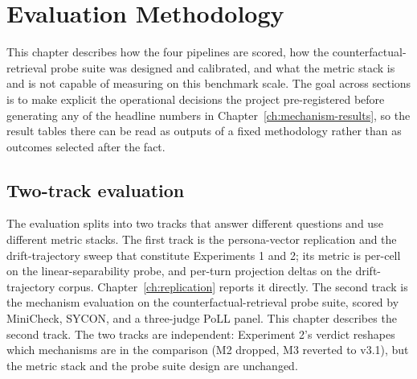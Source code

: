 \chapter{Evaluation Methodology}
\label{ch:methodology}

This chapter describes how the four pipelines are scored, how the counterfactual-retrieval probe suite was designed and calibrated, and what the metric stack is and is not capable of measuring on this benchmark scale. The goal across sections is to make explicit the operational decisions the project pre-registered before generating any of the headline numbers in Chapter~\ref{ch:mechanism-results}, so the result tables there can be read as outputs of a fixed methodology rather than as outcomes selected after the fact.

\section{Two-track evaluation}

The evaluation splits into two tracks that answer different questions and use different metric stacks. The first track is the persona-vector replication and the drift-trajectory sweep that constitute Experiments 1 and 2; its metric is per-cell \auroc{} on the linear-separability probe, and per-turn projection deltas on the drift-trajectory corpus. Chapter~\ref{ch:replication} reports it directly. The second track is the mechanism evaluation on the counterfactual-retrieval probe suite, scored by MiniCheck, SYCON, and a three-judge PoLL panel. This chapter describes the second track. The two tracks are independent: Experiment 2's verdict reshapes which mechanisms are in the comparison (M2 dropped, M3 reverted to v3.1), but the metric stack and the probe suite design are unchanged.

